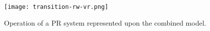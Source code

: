 

\begin{figure}[h]
	\begin{center}
		\texttt{[image: transition-rw-vr.png]}
		\caption{Operation of a PR system represented upon the combined model.}
		\label{focus-locus-sensus-with-virtuality-continuum-with-transition}
	\end{center}	
\end{figure}







